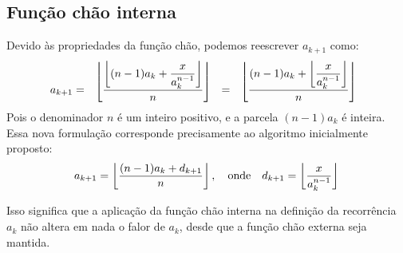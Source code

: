\subsection*{Função chão interna}

Devido às propriedades da função chão,
podemos reescrever $a_{k+1}$ como:
\[
  a_{k+1}
  = \bracketize[.75em]{\lfloor}{\rfloor}{
      \dfrac{\left\lfloor
               (n-1) a_k + \dfrac{x}{a_k^{n-1}}
             \right\rfloor}
            {n}
    } \\
  = \bracketize[.75em]{\lfloor}{\rfloor}{
      \dfrac{(n-1) a_k +
             \left\lfloor \dfrac{x}{a_k^{n-1}} \right\rfloor}
            {n}
    } \\
\]
Pois o denominador $n$ é um inteiro positivo,
e a parcela $(n - 1) a_k$ é inteira.
Essa nova formulação corresponde precisamente
ao algoritmo inicialmente proposto:
\[
  a_{k+1} = \left\lfloor \dfrac{(n-1) a_k + d_{k+1}}{n} \right\rfloor,
  \quad\text{onde}\quad
  d_{k+1} = \left\lfloor \dfrac{x}{a_k^{n-1}} \right\rfloor \\
\]

Isso significa que a aplicação da função chão interna
na definição da recorrência $a_k$ não altera em nada o falor de $a_k$,
desde que a função chão externa seja mantida.
